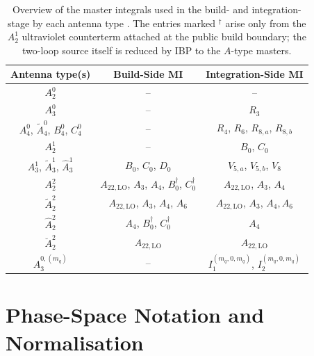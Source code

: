 \begin{table}[h!]
\footnotesize
\centering
\caption{Overview of the master integrals used in the build- and integration-stage by each antenna type \cite{Gehrmann-DeRidder:2005btv,GehrmannDeRidder0311276}. The entries marked $^\dagger$ arise only from the $A_2^1$ ultraviolet counterterm attached at the public build boundary; the two-loop source itself is reduced by IBP to the $A$-type masters.}
\renewcommand{\arraystretch}{1.3}
  \begin{tabular}{|c|c|c|} 
   \hline
   \textbf{Antenna type(s)} & \textbf{Build-Side MI} & \textbf{Integration-Side MI} \\ 
   \hline
   $A_2^0$ & -- & -- \\ \hline
   $A_3^0$ & -- & $R_3$ \\ \hline
   $A_4^0$, $\tilde A_4^0$, $B_4^0$, $C_4^0$ & -- & $R_4$, $R_6$, $R_{8,a}$, $R_{8,b}$ \\ \hline
   $A_2^1$ & -- & $B_0$, $C_0$ \\ \hline
   $A_3^1$, $\tilde A_3^1$, $\hat A_3^1$ & $B_0$, $C_0$, $D_0$ & $V_{5,a}$, $V_{5,b}$, $V_8$ \\ \hline
   $A_2^2$ & $A_{22,\text{LO}}$, $A_3$, $A_4$, $B_0^\dagger$, $C_0^\dagger$ & $A_{22,\text{LO}}$, $A_3$, $A_4$ \\ \hline
   $\tilde A_2^2$ & $A_{22,\text{LO}}$, $A_3$, $A_4$, $A_6$ & $A_{22,\text{LO}}$, $A_3$, $A_4, A_6$ \\ \hline
   $\hat A_2^2$ & $A_4$, $B_0^\dagger$, $C_0^\dagger$ & $A_4$ \\ \hline
   $\breve A_2^2$ & $A_{22,\text{LO}}$ & $A_{22,\text{LO}}$ \\ \hline
   $A_3^{0,(m_q)}$ & -- & $I_1^{(m_q,0,m_q)}$, $I_2^{(m_q,0,m_q)}$ \\ \hline
  \end{tabular}
   
\label{tab:MI}
\end{table}

\section{Phase-Space Notation and Normalisation}\label{sec:MInotation}


